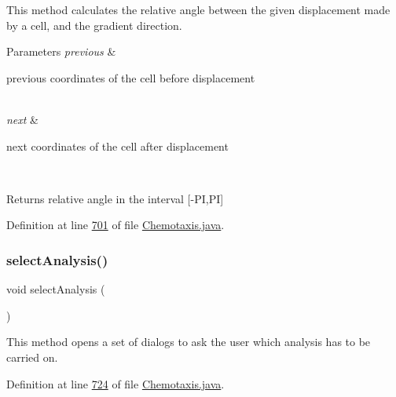 This method calculates the relative angle between the given displacement made by a cell, and the gradient direction.


\begin{DoxyParams}{Parameters}
{\em previous} & 
\begin{DoxyItemize}
\item previous coordinates of the cell before displacement 
\end{DoxyItemize}\\
\hline
{\em next} & 
\begin{DoxyItemize}
\item next coordinates of the cell after displacement 
\end{DoxyItemize}\\
\hline
\end{DoxyParams}
\begin{DoxyReturn}{Returns}
relative angle in the interval \mbox{[}-\/\+PI,PI\mbox{]} 
\end{DoxyReturn}


Definition at line \hyperlink{_chemotaxis_8java_source_l00701}{701} of file \hyperlink{_chemotaxis_8java_source}{Chemotaxis.\+java}.

\hypertarget{classanalysis_1_1_chemotaxis_aef66a58ab7f95817a68a3429550562fc}{}\label{classanalysis_1_1_chemotaxis_aef66a58ab7f95817a68a3429550562fc} 
\subsubsection{\texorpdfstring{select\+Analysis()}{selectAnalysis()}}
{\footnotesize\ttfamily void select\+Analysis (\begin{DoxyParamCaption}{ }\end{DoxyParamCaption})}

This method opens a set of dialogs to ask the user which analysis has to be carried on. 

Definition at line \hyperlink{_chemotaxis_8java_source_l00724}{724} of file \hyperlink{_chemotaxis_8java_source}{Chemotaxis.\+java}.

\hypertarget{classanalysis_1_1_chemotaxis_ac5db76309b6da4b0f351cdbb5876fec4}{}\label{classanalysis_1_1_chemotaxis_ac5db76309b6da4b0f351cdbb5876fec4} 
